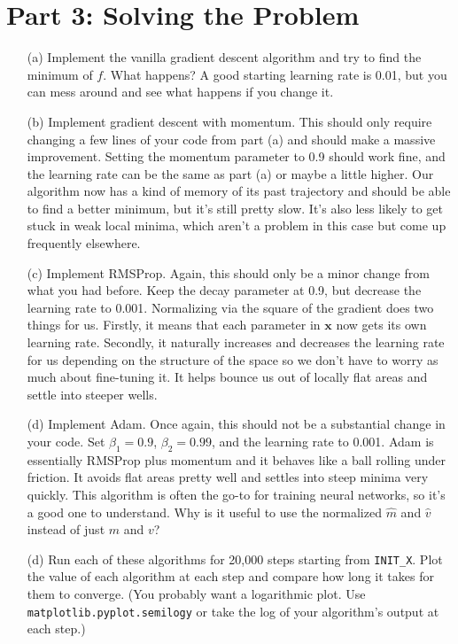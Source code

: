\documentclass[12pt]{article}
\begin{document}
\section*{Part 3: Solving the Problem}

\begin{enumerate}
\item[(a)]
	Implement the vanilla gradient descent algorithm and try to find the minimum of $f$.  What happens?  A good starting learning rate is 0.01, but you can mess around and see what happens if you change it.
	
	
\item[(b)]
	Implement gradient descent with momentum.  This should only require changing a few lines of your code from part (a) and should make a massive improvement.  Setting the momentum parameter to 0.9 should work fine, and the learning rate can be the same as part (a) or maybe a little higher.  Our algorithm now has a kind of memory of its past trajectory and should be able to find a better minimum, but it's still pretty slow.  It's also less likely to get stuck in weak local minima, which aren't a problem in this case but come up frequently elsewhere.
	

\item[(c)]
	Implement RMSProp.  Again, this should only be a minor change from what you had before.  Keep the decay parameter at 0.9, but decrease the learning rate to 0.001.  Normalizing via the square of the gradient does two things for us.  Firstly, it means that each parameter in $\mathbf{x}$ now gets its own learning rate.  Secondly, it naturally increases and decreases the learning rate for us depending on the structure of the space so we don't have to worry as much about fine-tuning it.  It helps bounce us out of locally flat areas and settle into steeper wells.
	
	
\item[(d)]
	Implement Adam.  Once again, this should not be a substantial change in your code.  Set $\beta_1 = 0.9$, $\beta_2 = 0.99$, and the learning rate to 0.001.  Adam is essentially RMSProp plus momentum and it behaves like a ball rolling under friction.  It avoids flat areas pretty well and settles into steep minima very quickly.  This algorithm is often the go-to for training neural networks, so it's a good one to understand.  Why is it useful to use the normalized $\hat{m}$ and $\hat{v}$ instead of just $m$ and $v$?
		
		
\item[(d)]
	Run each of these algorithms for 20,000 steps starting from \texttt{INIT\_X}.  Plot the value of each algorithm at each step and compare how long it takes for them to converge.  (You probably want a logarithmic plot.  Use \texttt{matplotlib.pyplot.semilogy} or take the log of your algorithm's output at each step.)
	

\end{enumerate}
\end{document}
